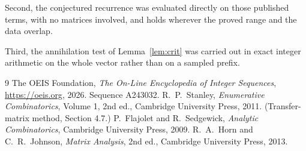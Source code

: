 \documentclass[11pt,a4paper]{article}
\theoremstyle{plain}
\theoremstyle{definition}
\begin{document}
Second, the conjectured recurrence was evaluated directly on those published terms, with no
matrices involved, and holds wherever the proved range and the data overlap.

Third, the annihilation test of Lemma~\ref{lem:crit} was carried out in exact integer
arithmetic on the whole vector rather than on a sampled prefix.

\begin{thebibliography}{9}
 The OEIS Foundation, \emph{The On-Line Encyclopedia of Integer
Sequences}, \url{https://oeis.org}, 2026. Sequence A243032.
 R.~P.~Stanley, \emph{Enumerative Combinatorics}, Volume 1, 2nd ed.,
Cambridge University Press, 2011. (Transfer-matrix method, Section 4.7.)
 P.~Flajolet and R.~Sedgewick, \emph{Analytic Combinatorics}, Cambridge
University Press, 2009.
 R.~A.~Horn and C.~R.~Johnson, \emph{Matrix Analysis}, 2nd ed., Cambridge
University Press, 2013.
\end{thebibliography}
\end{document}
